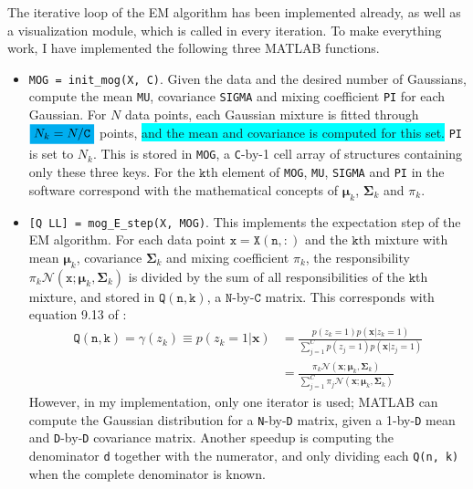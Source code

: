 \documentclass[a4paper,11pt]{article}
\newcommand{\V}[1]{\ensuremath{\mathbf{#1}}}
\newcommand{\T}[1]{\ensuremath{\mathtt{#1}}}
\newcommand{\muk}{\ensuremath{\boldsymbol{\mu}_k}}
\newcommand{\covk}{\ensuremath{\boldsymbol{\Sigma}_k}}
\newcommand{\mck}{\ensuremath{\pi_{k}}}
\newcommand{\hl}[1]{\colorbox{cyan}{#1}}
\newcommand{\mhl}[1]{\mathchoice%
  {\colorbox{cyan}{$\displaystyle#1$}}%
  {\colorbox{cyan}{$\textstyle#1$}}%
  {\colorbox{cyan}{$\scriptstyle#1$}}%
  {\colorbox{cyan}{$\scriptscriptstyle#1$}}}
\begin{document}
The iterative loop of the EM algorithm has been implemented already, as well as a visualization module, which is called in every iteration.  To make everything work, I have implemented the following three MATLAB functions.
\begin{itemize}
\item \texttt{MOG = init\_mog(X, C)}.  Given the data and the desired number of Gaussians, compute the mean \texttt{MU}, covariance \texttt{SIGMA} and mixing coefficient \texttt{PI} for each Gaussian.  For $N$ data points, each Gaussian mixture is fitted through $\mhl{N_k = N / \T{C}}$ points, \hl{and the mean and covariance is computed for this set.}  \texttt{PI} is set to $N_k$.  This is stored in \texttt{MOG}, a \texttt{C}-by-1 cell array of structures containing only these three keys.  For the $\T{k}$th element of \texttt{MOG}, \texttt{MU}, \texttt{SIGMA} and \texttt{PI} in the software correspond with the mathematical concepts of $\muk$, $\covk$ and $\mck$. 
%
\item \texttt{[Q LL] = mog\_E\_step(X, MOG)}.  This implements the expectation step of the EM algorithm.  For each data point $\mathtt{x} = \mathtt{X(n, :)}$ and the $\T{k}$th mixture with mean $\muk$, covariance $\covk$ and mixing coefficient $\mck$, the responsibility $\mck \mathcal{N}(\T{x} ; \muk, \covk)$ is divided by the sum of all responsibilities of the $\T{k}$th mixture, and stored in $\T{Q(n, k)}$, a $\T{N}$-by-$\T{C}$ matrix.  This corresponds with equation 9.13 of \cite{Bishop}:
\begin{align*}
\T{Q(n, k)} = \gamma(z_k) \equiv p(z_k = 1 | \V{x}) 
    &= \frac{p(z_k = 1) p(\V{x} | z_k = 1)}{\sum_{j=1}^{C} p(z_j = 1) p(\V{x} | z_j = 1)} \\
    &= \frac{\mck \mathcal{N}(\V{x} ; \muk, \covk)}{\sum_{j=1}^{C} \pi_j \mathcal{N}(\V{x} ; \muk, \covk)}
\end{align*}
However, in my implementation, only one iterator is used; MATLAB can compute the Gaussian distribution for a \texttt{N}-by-\texttt{D} matrix, given a 1-by-\texttt{D} mean and \texttt{D}-by-\texttt{D} covariance matrix.  Another speedup is computing the denominator \texttt{d} together with the numerator, and only dividing each \texttt{Q(n, k)} when the complete denominator is known.


\end{itemize}
\end{document}
